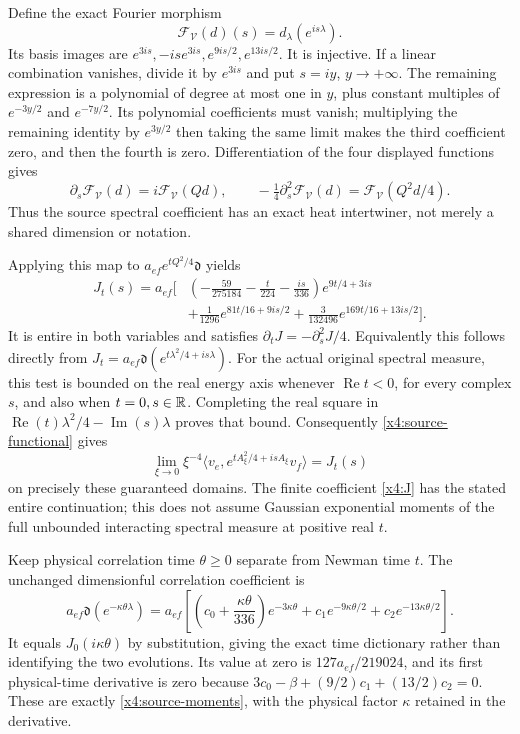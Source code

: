 Define the exact Fourier morphism
\[
\mathcal F_{\mathcal V}(d)(s)=d_\lambda(e^{is\lambda}).
\]
Its basis images are $e^{3is},-is e^{3is},e^{9is/2},e^{13is/2}$.
It is injective. If a linear combination vanishes, divide it by
$e^{3is}$ and put $s=iy$, $y\to+\infty$. The remaining expression
is a polynomial of degree at most one in $y$, plus constant multiples
of $e^{-3y/2}$ and $e^{-7y/2}$. Its polynomial coefficients must
vanish; multiplying the remaining identity by $e^{3y/2}$ then taking
the same limit makes the third coefficient zero, and then the fourth
is zero. Differentiation of the four displayed functions gives
\[
\partial_s\mathcal F_{\mathcal V}(d)
 =i\mathcal F_{\mathcal V}(Qd),\qquad
-\tfrac14\partial_s^2\mathcal F_{\mathcal V}(d)
 =\mathcal F_{\mathcal V}(Q^2d/4).
\]
Thus the source spectral coefficient has an exact heat intertwiner,
not merely a shared dimension or notation.

Applying this map to $a_{ef}e^{tQ^2/4}\mathfrak d$ yields
\begin{equation}
\begin{split}
J_t(s)=a_{ef}\biggl[&
 \left(-\frac{59}{275184}-\frac{t}{224}-\frac{is}{336}\right)
                                  e^{9t/4+3is}\\
&+\frac1{1296}e^{81t/16+9is/2}
 +\frac3{132496}e^{169t/16+13is/2}\biggr].
\end{split}
\label{x4:J}
\end{equation}
It is entire in both variables and satisfies
$\partial_tJ=-\partial_s^2J/4$. Equivalently this follows directly
from $J_t=a_{ef}\mathfrak d(e^{t\lambda^2/4+is\lambda})$.
For the actual original spectral measure, this test is bounded on
the real energy axis whenever $\operatorname{Re}t<0$, for every
complex $s$, and also when $t=0,s\in\mathbb R$. Completing the real square
in $\operatorname{Re}(t)\lambda^2/4-\operatorname{Im}(s)\lambda$
proves that bound. Consequently \eqref{x4:source-functional} gives
\[
\lim_{\xi\to0}\xi^{-4}
\langle v_e,e^{tA_\xi^2/4+isA_\xi}v_f\rangle=J_t(s)
\]
on precisely these guaranteed domains. The finite coefficient
\eqref{x4:J} has the stated entire continuation; this does not
assume Gaussian exponential moments of the full unbounded interacting
spectral measure at positive real $t$.

Keep physical correlation time $\theta\ge0$ separate from Newman
time $t$. The unchanged dimensionful correlation coefficient is
\[
a_{ef}\mathfrak d(e^{-\kappa\theta\lambda})
=a_{ef}\left[
 \left(c_0+\frac{\kappa\theta}{336}\right)e^{-3\kappa\theta}
 +c_1e^{-9\kappa\theta/2}+c_2e^{-13\kappa\theta/2}\right].
\]
It equals $J_0(i\kappa\theta)$ by substitution, giving the exact
time dictionary rather than identifying the two evolutions. Its value
at zero is $127a_{ef}/219024$, and its first physical-time derivative
is zero because
$3c_0-\beta+(9/2)c_1+(13/2)c_2=0$.
These are exactly \eqref{x4:source-moments}, with the physical factor
$\kappa$ retained in the derivative.
